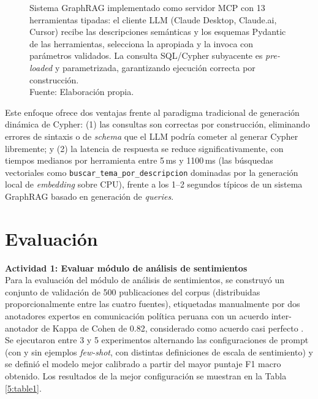 \documentclass[listof=nochaptergap,12pt,times,authoryear]{report}
\begin{document}
\begin{figure}[!ht]
\begin{center}

        \caption[Sistema GraphRAG basado en herramientas tipadas sobre protocolo MCP]{Sistema GraphRAG implementado como servidor MCP con 13 herramientas tipadas: el cliente LLM (Claude Desktop, Claude.ai, Cursor) recibe las descripciones semánticas y los esquemas Pydantic de las herramientas, selecciona la apropiada y la invoca con parámetros validados. La consulta SQL/Cypher subyacente es \textit{pre-loaded} y parametrizada, garantizando ejecución correcta por construcción.\\
            Fuente: Elaboración propia.}
        \label{5:fig22}
    \end{center}
\end{figure}

Este enfoque ofrece dos ventajas frente al paradigma tradicional de generación
dinámica de Cypher: (1) las consultas son correctas por construcción, eliminando
errores de sintaxis o de \textit{schema} que el LLM podría cometer al generar
Cypher libremente; y (2) la latencia de respuesta se reduce significativamente,
con tiempos medianos por herramienta entre 5\,ms y 1100\,ms (las búsquedas
vectoriales como \texttt{buscar\_tema\_por\_descripcion} dominadas por la
generación local de \textit{embedding} sobre CPU), frente a los 1--2 segundos
típicos de un sistema GraphRAG basado en generación de \textit{queries}.

\section{Evaluación}

\textbf{Actividad 1: Evaluar módulo de análisis de sentimientos}
\\
Para la evaluación del módulo de análisis de sentimientos, se construyó un conjunto
de validación de 500 publicaciones del corpus (distribuidas proporcionalmente entre
las cuatro fuentes), etiquetadas manualmente por dos anotadores expertos en comunicación
política peruana con un acuerdo inter-anotador de Kappa de Cohen de 0.82, considerado
como acuerdo casi perfecto \parencite{pr_alvi2023twitter_election_review}. Se ejecutaron
entre 3 y 5 experimentos alternando las configuraciones de prompt (con y sin ejemplos
\textit{few-shot}, con distintas definiciones de escala de sentimiento) y se definió
el modelo mejor calibrado a partir del mayor puntaje F1 macro obtenido. Los resultados
de la mejor configuración se muestran en la Tabla \ref{5:table1}.
\end{document}
